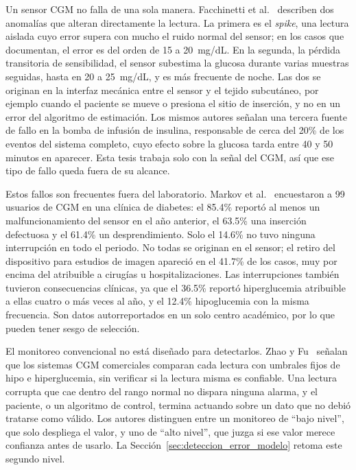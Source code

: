 \documentclass{report}
\begin{document}
Un sensor CGM no falla de una sola manera. Facchinetti et al.~\cite{facchinetti2013} describen dos anomalías que alteran directamente la lectura. La primera es el \textit{spike}, una lectura aislada cuyo error supera con mucho el ruido normal del sensor; en los casos que documentan, el error es del orden de 15 a 20~mg/dL. En la segunda, la pérdida transitoria de sensibilidad, el sensor subestima la glucosa durante varias muestras seguidas, hasta en 20 a 25~mg/dL, y es más frecuente de noche. Las dos se originan en la interfaz mecánica entre el sensor y el tejido subcutáneo, por ejemplo cuando el paciente se mueve o presiona el sitio de inserción, y no en un error del algoritmo de estimación. Los mismos autores señalan una tercera fuente de fallo en la bomba de infusión de insulina, responsable de cerca del 20\% de los eventos del sistema completo, cuyo efecto sobre la glucosa tarda entre 40 y 50 minutos en aparecer. Esta tesis trabaja solo con la señal del CGM, así que ese tipo de fallo queda fuera de su alcance.

Estos fallos son frecuentes fuera del laboratorio. Markov et al.~\cite{markov2024} encuestaron a 99 usuarios de CGM en una clínica de diabetes: el 85.4\% reportó al menos un malfuncionamiento del sensor en el año anterior, el 63.5\% una inserción defectuosa y el 61.4\% un desprendimiento. Solo el 14.6\% no tuvo ninguna interrupción en todo el periodo. No todas se originan en el sensor; el retiro del dispositivo para estudios de imagen apareció en el 41.7\% de los casos, muy por encima del atribuible a cirugías u hospitalizaciones. Las interrupciones también tuvieron consecuencias clínicas, ya que el 36.5\% reportó hiperglucemia atribuible a ellas cuatro o más veces al año, y el 12.4\% hipoglucemia con la misma frecuencia. Son datos autorreportados en un solo centro académico, por lo que pueden tener sesgo de selección.

El monitoreo convencional no está diseñado para detectarlos. Zhao y Fu~\cite{zhao2015statistical} señalan que los sistemas CGM comerciales comparan cada lectura con umbrales fijos de hipo e hiperglucemia, sin verificar si la lectura misma es confiable. Una lectura corrupta que cae dentro del rango normal no dispara ninguna alarma, y el paciente, o un algoritmo de control, termina actuando sobre un dato que no debió tratarse como válido. Los autores distinguen entre un monitoreo de ``bajo nivel'', que solo despliega el valor, y uno de ``alto nivel'', que juzga si ese valor merece confianza antes de usarlo. La Sección~\ref{sec:deteccion_error_modelo} retoma este segundo nivel.
\end{document}
